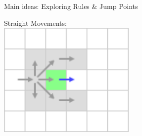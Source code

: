 \documentclass{presentation}
\begin{document}
\begin{frame}{Main ideas: Exploring Rules \& Jump Points}
	\begin{center}
		Straight Movements:\\
		\vspace{5mm}
		\includegraphics[width=0.5\textwidth]{figures/extra_geschnitten/sm.png}
	\end{center}
\end{frame}
\end{document}
